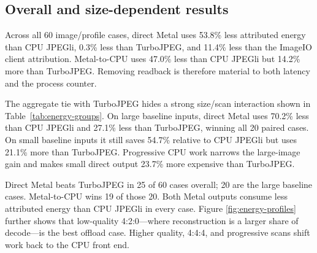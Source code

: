 \documentclass[10pt,twocolumn]{article}
\begin{document}
\subsection{Overall and size-dependent results}

Across all 60 image/profile cases, direct Metal uses 53.8\% less attributed
energy than CPU JPEGli, 0.3\% less than TurboJPEG, and 11.4\% less than the
ImageIO client attribution.  Metal-to-CPU uses 47.0\% less than CPU JPEGli but
14.2\% more than TurboJPEG.  Removing readback is therefore material to both
latency and the process counter.

The aggregate tie with TurboJPEG hides a strong size/scan interaction shown in
Table~\ref{tab:energy-groups}.  On large baseline inputs, direct Metal uses
70.2\% less than CPU JPEGli and 27.1\% less than TurboJPEG, winning all 20
paired cases.  On small baseline inputs it still saves 54.7\% relative to CPU
JPEGli but uses 21.1\% more than TurboJPEG.  Progressive CPU work narrows the
large-image gain and makes small direct output 23.7\% more expensive than
TurboJPEG.

\begin{table}[t]
  \centering
  \caption{Direct-Metal paired aggregate deltas.}
  \label{tab:energy-groups}
  \small
\end{table}

Direct Metal beats TurboJPEG in 25 of 60 cases overall; 20 are the large
baseline cases.  Metal-to-CPU wins 19 of those 20.  Both Metal outputs consume
less attributed energy than CPU JPEGli in every case.  Figure
\ref{fig:energy-profiles} further shows that low-quality 4:2:0---where
reconstruction is a larger share of decode---is the best offload case.  Higher
quality, 4:4:4, and progressive scans shift work back to the CPU front end.
\end{document}
